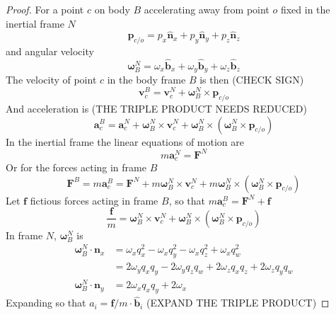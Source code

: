 \documentclass{amsart}
\theoremstyle{definition}
\theoremstyle{remark}
\numberwithin{equation}{section}
\begin{document}
\begin{proof}
  For a point $c$ on body $B$ accelerating away from point $o$ fixed in the inertial frame $N$
  \begin{equation}
    \mathbf{p}_{c/o} = p_x \mathbf{\hat{n}}_x + p_y \mathbf{\hat{n}}_y + p_z \mathbf{\hat{n}}_z
  \end{equation}
  and angular velocity
  \begin{equation}
    \boldsymbol\omega^N_B = \omega_x \mathbf{\hat{b}}_x + \omega_y \mathbf{\hat{b}}_y + \omega_z \mathbf{\hat{b}}_z
  \end{equation}
  The velocity of point $c$ in the body frame $B$ is then (CHECK SIGN)
  \begin{equation}
    \mathbf{v}^B_c = \mathbf{v}^N_c + {\boldsymbol\omega^N_B}\times\mathbf{p}_{c/o}
  \end{equation}
  And acceleration is (THE TRIPLE PRODUCT NEEDS REDUCED)
  \begin{equation}
    \mathbf{a}^B_c = \mathbf{a}^N_c + {\boldsymbol\omega^N_B}\times\mathbf{v}^N_c + {\boldsymbol\omega^N_B}\times\left({\boldsymbol\omega^N_B}\times\mathbf{p}_{c/o}\right)
  \end{equation}
  In the inertial frame the linear equations of motion are
  \begin{equation}
    m\mathbf{a}^N_c = \mathbf{F}^N
  \end{equation}
  Or for the forces acting in frame $B$
  \begin{equation}
    \mathbf{F}^B=m\mathbf{a}^B_c = \mathbf{F}^N + m{\boldsymbol\omega^N_B}\times\mathbf{v}^N_c + m{\boldsymbol\omega^N_B}\times\left({\boldsymbol\omega^N_B}\times\mathbf{p}_{c/o}\right)
  \end{equation}
  Let $\mathbf{f}$ fictious forces acting in frame $B$, so that $m\mathbf{a}^B_c = \mathbf{F}^N + \mathbf{f}$
  \begin{equation}
    \frac{\mathbf{f}}{m} = {\boldsymbol\omega^N_B}\times\mathbf{v}^N_c + {\boldsymbol\omega^N_B}\times\left({\boldsymbol\omega^N_B}\times\mathbf{p}_{c/o}\right)
  \end{equation}
  In frame $N$, $\boldsymbol\omega^N_B$ is
  \begin{align}
    {\boldsymbol\omega^N_B}\cdot\mathbf{n}_x &= \omega_xq_x^2-\omega_xq_y^2 -\omega_xq_z^2+\omega_xq_w^2 \nonumber \\
    &= 2\omega_yq_xq_y-2\omega_yq_zq_w +2\omega_zq_xq_z+2\omega_zq_yq_w \nonumber \\
    {\boldsymbol\omega^N_B}\cdot\mathbf{n}_y &= 2\omega_xq_xq_y+2\omega_x
  \end{align}
  Expanding so that $a_i=\mathbf{f}/m\cdot\mathbf{\hat{b}}_i$ (EXPAND THE TRIPLE PRODUCT)
  
\end{proof}
\end{document}
